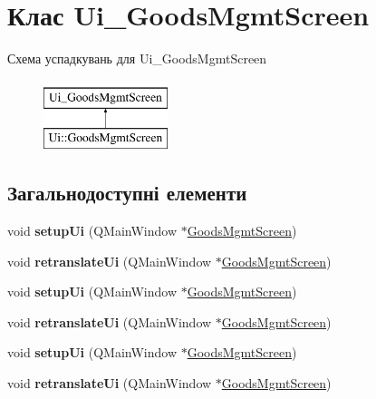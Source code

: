 \hypertarget{classUi__GoodsMgmtScreen}{\section{Клас Ui\-\_\-\-Goods\-Mgmt\-Screen}
\label{classUi__GoodsMgmtScreen}
}
Схема успадкувань для Ui\-\_\-\-Goods\-Mgmt\-Screen\begin{figure}[H]
\begin{center}
\leavevmode
\includegraphics[height=2.000000cm]{classUi__GoodsMgmtScreen}
\end{center}
\end{figure}
\subsection*{Загальнодоступні елементи}
\begin{DoxyCompactItemize}
\item 
\hypertarget{classUi__GoodsMgmtScreen_a8baf991b8f140c374f26406651bf3244}{void {\bfseries setup\-Ui} (Q\-Main\-Window $\ast$\hyperlink{classGoodsMgmtScreen}{Goods\-Mgmt\-Screen})}\label{classUi__GoodsMgmtScreen_a8baf991b8f140c374f26406651bf3244}

\item 
\hypertarget{classUi__GoodsMgmtScreen_a0cfda36456b30c0be0117295991c9a46}{void {\bfseries retranslate\-Ui} (Q\-Main\-Window $\ast$\hyperlink{classGoodsMgmtScreen}{Goods\-Mgmt\-Screen})}\label{classUi__GoodsMgmtScreen_a0cfda36456b30c0be0117295991c9a46}

\item 
\hypertarget{classUi__GoodsMgmtScreen_a8baf991b8f140c374f26406651bf3244}{void {\bfseries setup\-Ui} (Q\-Main\-Window $\ast$\hyperlink{classGoodsMgmtScreen}{Goods\-Mgmt\-Screen})}\label{classUi__GoodsMgmtScreen_a8baf991b8f140c374f26406651bf3244}

\item 
\hypertarget{classUi__GoodsMgmtScreen_a0cfda36456b30c0be0117295991c9a46}{void {\bfseries retranslate\-Ui} (Q\-Main\-Window $\ast$\hyperlink{classGoodsMgmtScreen}{Goods\-Mgmt\-Screen})}\label{classUi__GoodsMgmtScreen_a0cfda36456b30c0be0117295991c9a46}

\item 
\hypertarget{classUi__GoodsMgmtScreen_a8baf991b8f140c374f26406651bf3244}{void {\bfseries setup\-Ui} (Q\-Main\-Window $\ast$\hyperlink{classGoodsMgmtScreen}{Goods\-Mgmt\-Screen})}\label{classUi__GoodsMgmtScreen_a8baf991b8f140c374f26406651bf3244}

\item 
\hypertarget{classUi__GoodsMgmtScreen_a0cfda36456b30c0be0117295991c9a46}{void {\bfseries retranslate\-Ui} (Q\-Main\-Window $\ast$\hyperlink{classGoodsMgmtScreen}{Goods\-Mgmt\-Screen})}\label{classUi__GoodsMgmtScreen_a0cfda36456b30c0be0117295991c9a46}

\end{DoxyCompactItemize}
